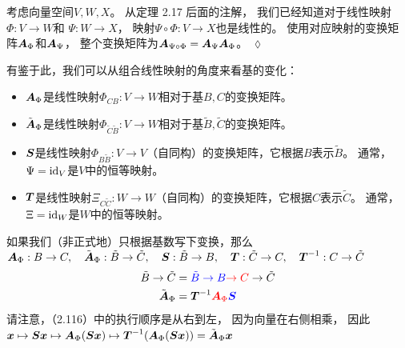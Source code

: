 \begin{remark}
    考虑向量空间$V, W, X$。
    从定理 2.17 后面的注解，
    我们已经知道对于线性映射$\Phi:V \rightarrow W$和
    $\Psi:W \rightarrow X$，
    映射$\Psi \circ \Phi:V \rightarrow X$也是线性的。
    使用对应映射的变换矩阵$\boldsymbol{A}_\Phi$和$\boldsymbol{A}_\Psi$，
    整个变换矩阵为$\boldsymbol{A}_{\Psi \circ \Phi} = \boldsymbol{A}_\Psi \boldsymbol{A}_\Phi$。
    \hfill $\lozenge$
\end{remark}

有鉴于此，我们可以从组合线性映射的角度来看基的变化：
\begin{itemize}
    \item $\boldsymbol{A}_\Phi$是线性映射$\Phi_{CB}:V \rightarrow W$相对于基$B, C$的变换矩阵。
    \item $\tilde{\boldsymbol{A}}_\Phi$是线性映射$\Phi_{\tilde{C} \tilde{B}}:V \rightarrow W$相对于基$\tilde{B}, \tilde{C}$的变换矩阵。
    \item $\boldsymbol{S}$是线性映射$\Phi_{B\tilde{B}}:V \rightarrow V$（自同构）的变换矩阵，它根据$B$表示$\tilde{B}$。
    通常，$\Psi = \mathrm{id}_V$是$V$中的恒等映射。
    \item $\boldsymbol{T}$是线性映射$\Xi_{C\tilde{C}}:W \rightarrow W$（自同构）的变换矩阵，它根据$C$表示$\tilde{C}$。
    通常，$\Xi = \mathrm{id}_W$是$W$中的恒等映射。
\end{itemize}
如果我们（非正式地）只根据基数写下变换，那么
$\boldsymbol{A}_\Phi : B \rightarrow C,\quad\tilde{\boldsymbol{A}}_\Phi : \tilde{B} \rightarrow \tilde{C},\quad\boldsymbol{S}: \tilde{B} \rightarrow B,\quad\boldsymbol{T} : \tilde{C} \rightarrow C,\quad\boldsymbol{T}^{-1}: C \rightarrow \tilde{C} $
\begin{align}
    \tilde{B} \rightarrow \tilde{C} &=
    {\color{blue} \tilde{B} \rightarrow B}
    {\color{red}\rightarrow C}
    \rightarrow \tilde{C}\\
    \tilde{\boldsymbol{A}}_\Phi &= \boldsymbol{T}^{-1}
    {\color{red}\boldsymbol{A}_\Phi}
    {\color{blue}\boldsymbol{S}}
\end{align}
请注意，（2.116）中的执行顺序是从右到左，
因为向量在右侧相乘，
因此
$\boldsymbol{x} \mapsto \boldsymbol{S}\boldsymbol{x}
\mapsto \boldsymbol{A}_\Phi (\boldsymbol{S}\boldsymbol{x})
\mapsto \boldsymbol{T}^{-1}(\boldsymbol{A}_\Phi (\boldsymbol{S}\boldsymbol{x})) = \tilde{\boldsymbol{A}}_\Phi \boldsymbol{x}$

